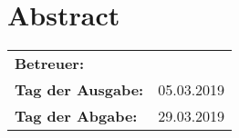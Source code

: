 \chapter*{Abstract}

\vfill

\begin{tabular}{ll}
	\bfseries Betreuer: & \parbox[t]{10cm}{\betreuer }\vspace{5mm} \\
	\bfseries Tag der Ausgabe: & 05.03.2019 \\
	\bfseries Tag der Abgabe: & 29.03.2019 \\
\end{tabular}
